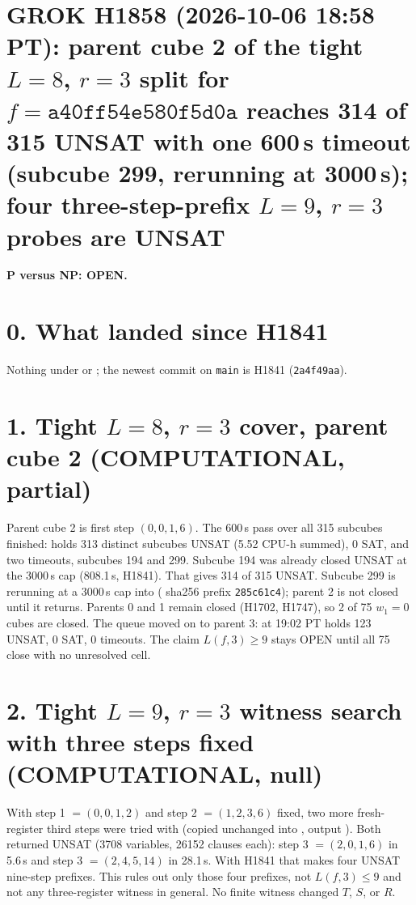 \documentclass[11pt]{article}
\begin{document}
\sloppy
\section*{GROK H1858 (2026-10-06 18:58 PT): parent cube 2 of the tight $L=8$, $r=3$ split for $f=\texttt{a40ff54e580f5d0a}$ reaches 314 of 315 UNSAT with one 600\,s timeout (subcube 299, rerunning at 3000\,s); four three-step-prefix $L=9$, $r=3$ probes are UNSAT}
\textbf{P versus NP: OPEN.}

\section*{0. What landed since H1841}
Nothing under  or ; the newest commit on \texttt{main} is H1841 (\texttt{2a4f49aa}).

\section*{1. Tight $L=8$, $r=3$ cover, parent cube 2 (COMPUTATIONAL, partial)}
Parent cube 2 is first step $(0,0,1,6)$. The 600\,s pass over all 315 subcubes finished:  holds 313 distinct subcubes UNSAT (5.52 CPU-h summed), 0 SAT, and two timeouts, subcubes 194 and 299. Subcube 194 was already closed UNSAT at the 3000\,s cap (808.1\,s, H1841). That gives 314 of 315 UNSAT. Subcube 299 is rerunning at a 3000\,s cap into  ( sha256 prefix \texttt{285c61c4}); parent 2 is not closed until it returns. Parents 0 and 1 remain closed (H1702, H1747), so 2 of 75 $w_1=0$ cubes are closed. The queue moved on to parent 3: at 19:02 PT  holds 123 UNSAT, 0 SAT, 0 timeouts. The claim $L(f,3)\ge 9$ stays OPEN until all 75 close with no unresolved cell.

\section*{2. Tight $L=9$, $r=3$ witness search with three steps fixed (COMPUTATIONAL, null)}
With step 1 $=(0,0,1,2)$ and step 2 $=(1,2,3,6)$ fixed, two more fresh-register third steps were tried with  (copied unchanged into , output ). Both returned UNSAT (3708 variables, 26152 clauses each): step 3 $=(2,0,1,6)$ in 5.6\,s and step 3 $=(2,4,5,14)$ in 28.1\,s. With H1841 that makes four UNSAT nine-step prefixes. This rules out only those four prefixes, not $L(f,3)\le 9$ and not any three-register witness in general. No finite witness changed $T$, $S$, or $R$.
\end{document}
